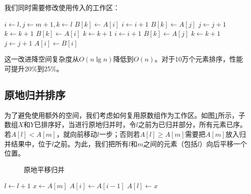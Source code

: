 \documentclass[b5paper]{ctexart}
\begin{document}
我们同时需要修改使用传入的工作区：

\begin{algorithmic}[1]
  \State $i \gets l, j \gets m + 1, k \gets l$
      \State $B[k] \gets A[i]$
      \State $i \gets i + 1$
    \Else
      \State $B[k] \gets A[j]$
      \State $j \gets j + 1$
    \EndIf
    \State $k \gets k + 1$
  \EndWhile
    \State $B[k] \gets A[i]$
    \State $k \gets k + 1$
    \State $i \gets i + 1$
  \EndWhile
    \State $B[k] \gets A[j]$
    \State $k \gets k + 1$
    \State $j \gets j + 1$
  \EndWhile
   
    \State $A[i] \gets B[i]$
  \EndFor
\EndProcedure
\end{algorithmic}

这一改进降空间复杂度从$O(n \lg n)$降低到$O(n)$。对于10万个元素排序，性能可提升20\%到25\%。

\subsection{原地归并排序}

为了避免使用额外的空间，我们考虑如何复用原数组作为工作区。如图\ref{fig:merge-in-place-naive}所示，子数组$X$和$Y$已排序好，当进行原地归并时，令$l$之前为已归并部分，所有元素已序。若$A[l] < A[m]$，就向前移动$l$一步；否则若$A[l] \geq A[m]$需要把$A[m]$放入归并结果中，位于$l$之前。为此，我们把所有$l$和$m$之间的元素（包括$l$）向后平移一个位置。

\begin{figure}[htbp]
 \centering
 \caption{原地平移归并}
 \label{fig:merge-in-place-naive}
\end{figure}

\begin{algorithmic}[1]
      \State $l \gets l + 1$
    \Else
      \State $x \gets A[m]$
       
        \State $A[i] \gets A[i-1]$
      \EndFor
      \State $A[l] \gets x$
    \EndIf
  \EndWhile
\EndProcedure
\end{algorithmic}
\end{document}
